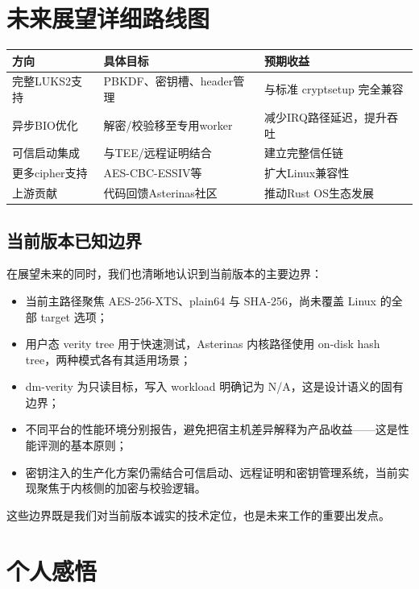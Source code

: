 \section{未来展望详细路线图}

\begin{table}[H]
    \centering
    \begin{tabular}{p{}p{}p{}}
        \toprule
        \textbf{方向} & \textbf{具体目标} & \textbf{预期收益} \\
        \midrule
        完整LUKS2支持 & PBKDF、密钥槽、header管理 & 与标准 cryptsetup 完全兼容 \\
        异步BIO优化 & 解密/校验移至专用worker & 减少IRQ路径延迟，提升吞吐 \\
        可信启动集成 & 与TEE/远程证明结合 & 建立完整信任链 \\
        更多cipher支持 & AES-CBC-ESSIV等 & 扩大Linux兼容性 \\
        上游贡献 & 代码回馈Asterinas社区 & 推动Rust OS生态发展 \\
        \bottomrule
    \end{tabular}
\end{table}

\subsection*{当前版本已知边界}

在展望未来的同时，我们也清晰地认识到当前版本的主要边界：

\begin{itemize}
    \item 当前主路径聚焦 AES-256-XTS、plain64 与 SHA-256，尚未覆盖 Linux 的全部 target 选项；
    \item 用户态 verity tree 用于快速测试，Asterinas 内核路径使用 on-disk hash tree，两种模式各有其适用场景；
    \item dm-verity 为只读目标，写入 workload 明确记为 N/A，这是设计语义的固有边界；
    \item 不同平台的性能环境分别报告，避免把宿主机差异解释为产品收益——这是性能评测的基本原则；
    \item 密钥注入的生产化方案仍需结合可信启动、远程证明和密钥管理系统，当前实现聚焦于内核侧的加密与校验逻辑。
\end{itemize}

这些边界既是我们对当前版本诚实的技术定位，也是未来工作的重要出发点。

\section{个人感悟}

